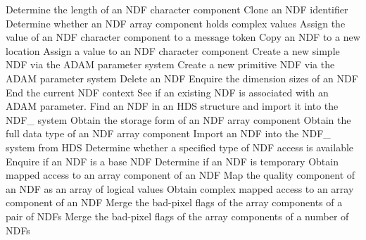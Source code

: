 {\begin{description}{\addtolength{\itemindent}{-8mm}}
            {Determine the length of an NDF character component}
            {Clone an NDF identifier}
            {Determine whether an NDF array component holds complex values}
            {Assign the value of an NDF character component to a message token}
            {Copy an NDF to a new location}
            {Assign a value to an NDF character component}
            {Create a new simple NDF via the ADAM parameter system}
            {Create a new primitive NDF via the ADAM parameter system}
            {Delete an NDF}
            {Enquire the dimension sizes of an NDF}
            {End the current NDF context}
            {See if an existing NDF is associated with an ADAM parameter.}
            {Find an NDF in an HDS structure and import it into the NDF\_ system}
            {Obtain the storage form of an NDF array component}
            {Obtain the full data type of an NDF array component}
            {Import an NDF into the NDF\_ system from HDS}
            {Determine whether a specified type of NDF access is available}
            {Enquire if an NDF is a base NDF}
            {Determine if an NDF is temporary}
            {Obtain mapped access to an array component of an NDF}
            {Map the quality component of an NDF as an array of logical values}
            {Obtain complex mapped access to an array component of an NDF}
            {Merge the bad-pixel flags of the array components of a pair of NDFs}
            {Merge the bad-pixel flags of the array components of a number of NDFs}

\end{description}}
